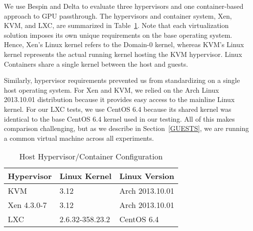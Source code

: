 We use Bespin and Delta to evaluate three hypervisors and one container-based
approach to GPU passthrough. The hypervisors and container system, Xen, KVM, and LXC, are summarized in Table~\ref{HYPERVISORS}.  Note that each
virtualization solution imposes its own unique requirements on the base
operating system.  Hence, Xen's Linux kernel refers to the Domain-0 kernel,
whereas KVM's Linux kernel represents the actual running kernel hosting the KVM
hypervisor.  Linux Containers share a single kernel between the host
and guests.  

Similarly, hypervisor requirements prevented us from standardizing on a single host operating system.  For Xen
and KVM, we relied on the Arch Linux 2013.10.01 distribution because it provides
easy access to the mainline Linux kernel.  For our LXC tests, we use CentOS
6.4 because its shared kernel was identical to the base CentOS 6.4 kernel used
in our testing.   All of this makes comparison challenging, but as we describe in
Section~\ref{GUESTS}, we are running a common virtual machine across all
experiments.





\begin{table}
\small
\renewcommand{\arraystretch}{1.3}
\caption{Host Hypervisor/Container Configuration}
\label{HYPERVISORS}
\centering
\begin{tabular}{|l||l|l|}
\hline
Hypervisor & Linux Kernel & Linux Version \\ \hline 
KVM & 3.12 & Arch 2013.10.01 \\ \hline 
Xen 4.3.0-7 & 3.12 & Arch 2013.10.01 \\ \hline
LXC & 2.6.32-358.23.2 & CentOS 6.4 \\ \hline

\end{tabular}
\end{table}


